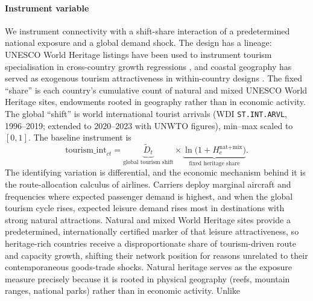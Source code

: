 \paragraph{\textbf{Instrument variable}} We instrument connectivity with a shift-share
interaction of a predetermined national exposure and a global demand shock.
The design has a lineage: UNESCO World Heritage listings have been used to
instrument tourism specialisation in cross-country growth regressions
\citep{Arezki_2009}, and coastal geography has served as exogenous tourism
attractiveness in within-country designs \citep{Faber_2019}. The fixed
``share'' is each country's cumulative count of natural and mixed
UNESCO World Heritage sites, endowments rooted in geography rather than in
economic activity. The global ``shift'' is world international tourist
arrivals (WDI \texttt{ST.INT.ARVL}, 1996--2019; extended to 2020--2023 with
UNWTO figures), min--max scaled to $[0,1]$. The baseline instrument is
\begin{equation}
\text{tourism\_int}_{ct}
= \underbrace{\widetilde{D}_t}_{\text{global tourism shift}}
\times \underbrace{\ln\!\bigl(1+H_c^{\text{nat+mix}}\bigr)}_{\text{fixed heritage share}}.
\label{eq:instr}
\end{equation}
The identifying variation is differential, and the economic mechanism behind it is the route-allocation calculus of airlines. Carriers deploy marginal aircraft and frequencies where expected passenger demand is
highest, and when the global tourism cycle rises, expected leisure demand rises most in destinations with strong natural attractions. Natural and mixed World Heritage sites provide a predetermined, internationally
certified marker of that leisure attractiveness, so heritage-rich countries receive a disproportionate share of tourism-driven route and capacity growth, shifting their network position for reasons unrelated to their
contemporaneous goods-trade shocks. Natural heritage serves as the exposure measure precisely because it is rooted in physical geography (reefs, mountain ranges, national parks) rather than in economic activity. Unlike
